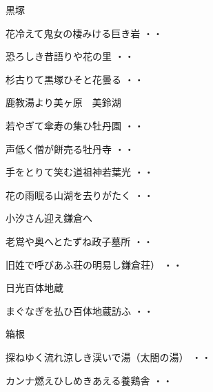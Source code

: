 \vspace{0.6cm}
黒塚
\begin{shiika}花冷えて鬼女の棲みける巨き岩
\hfill{・・}\end{shiika}
\begin{shiika}恐ろしき昔語りや花の里
\hfill{・・}\end{shiika}
\begin{shiika}杉古りて黒塚ひそと花曇る
\hfill{・・}\end{shiika}
\vspace{0.6cm}
鹿教湯より美ヶ原　美鈴湖
\begin{shiika}若やぎて傘寿の集ひ牡丹園
\hfill{・・}\end{shiika}
\begin{shiika}声低く僧が餅売る牡丹寺
\hfill{・・}\end{shiika}
\begin{shiika}手をとりて笑む道祖神若葉光
\hfill{・・}\end{shiika}
\begin{shiika}花の雨眠る山湖を去りがたく
\hfill{・・}\end{shiika}
\vspace{0.6cm}
小汐さん迎え鎌倉へ
\begin{shiika}老鴬や奥へとたずね政子墓所
\hfill{・・}\end{shiika}
\vspace{0.6cm}
\begin{shiika}旧姓で呼びあふ荘の明易し鎌倉荘）
\hfill{・・}\end{shiika}
\vspace{0.6cm}
日光百体地蔵
\begin{shiika}まぐなぎを払ひ百体地蔵訪ふ
\hfill{・・}\end{shiika}
\vspace{0.6cm}
箱根
\begin{shiika}探ねゆく流れ涼しき渓いで湯（太閤の湯）
\hfill{・・}\end{shiika}
\begin{shiika}カンナ燃えひしめきあえる養鶏舎
\hfill{・・}\end{shiika}
